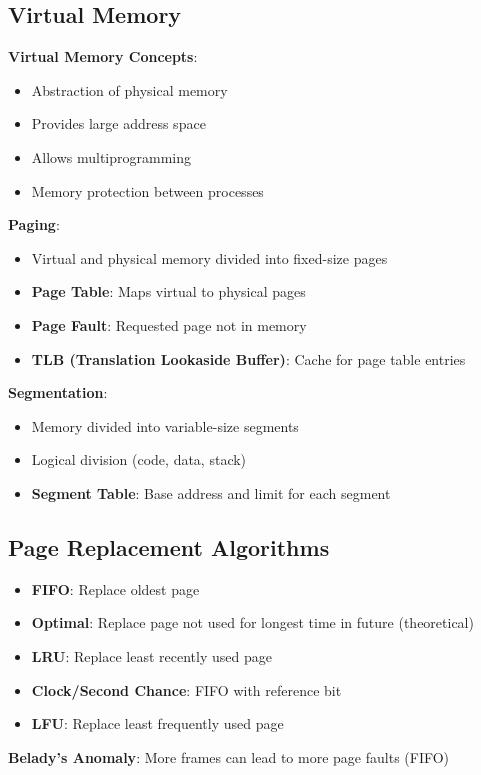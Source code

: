 \documentclass[12pt,a4paper]{report}
\begin{document}
\subsection{Virtual Memory}
\begin{concept}
\textbf{Virtual Memory Concepts}:
\begin{itemize}
    \item Abstraction of physical memory
    \item Provides large address space
    \item Allows multiprogramming
    \item Memory protection between processes
\end{itemize}

\textbf{Paging}:
\begin{itemize}
    \item Virtual and physical memory divided into fixed-size pages
    \item \textbf{Page Table}: Maps virtual to physical pages
    \item \textbf{Page Fault}: Requested page not in memory
    \item \textbf{TLB (Translation Lookaside Buffer)}: Cache for page table entries
\end{itemize}

\textbf{Segmentation}:
\begin{itemize}
    \item Memory divided into variable-size segments
    \item Logical division (code, data, stack)
    \item \textbf{Segment Table}: Base address and limit for each segment
\end{itemize}
\end{concept}

\subsection{Page Replacement Algorithms}
\begin{concept}
\begin{itemize}
    \item \textbf{FIFO}: Replace oldest page
    \item \textbf{Optimal}: Replace page not used for longest time in future (theoretical)
    \item \textbf{LRU}: Replace least recently used page
    \item \textbf{Clock/Second Chance}: FIFO with reference bit
    \item \textbf{LFU}: Replace least frequently used page
\end{itemize}

\textbf{Belady's Anomaly}: More frames can lead to more page faults (FIFO)
\end{concept}
\end{document}
